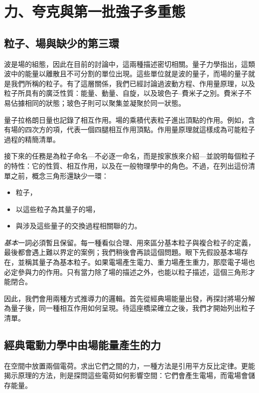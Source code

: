 \chapter{力、夸克與第一批強子多重態}

\section{粒子、場與缺少的第三環}

波是場的組態，因此在目前的討論中，這兩種描述密切相關。量子力學指出，這類波中的能量以離散且不可分割的單位出現。這些單位就是波的量子，而場的量子就是我們所稱的粒子。有了這層關係，我們已經討論過波動方程、作用量原理，以及粒子所具有的廣泛性質：能量、動量、自旋，以及玻色子--費米子之別。費米子不易佔據相同的狀態；玻色子則可以聚集並凝聚於同一狀態。

量子拉格朗日量也記錄了相互作用。場的乘積代表粒子進出頂點的作用。例如，含有場的四次方的項，代表一個四腿相互作用頂點。作用量原理就這樣成為可能粒子過程的精簡清單。

接下來的任務是為粒子命名---不必逐一命名，而是按家族來介紹---並說明每個粒子的特性：它的性質、相互作用，以及在一般物理學中的角色。不過，在列出這份清單之前，概念三角形還缺少一環：
\begin{itemize}
\item 粒子，
\item 以這些粒子為其量子的場，
\item 與涉及這些量子的交換過程相關聯的力。
\end{itemize}

\emph{基本}一詞必須暫且保留。每一種看似合理、用來區分基本粒子與複合粒子的定義，最後都會遇上難以界定的案例；我們稍後會再談這個問題。眼下先假設基本場存在，並稱其量子為基本粒子。如果電場產生電力、重力場產生重力，那麼電子場也必定參與力的作用。只有當力除了場的描述之外，也能以粒子描述，這個三角形才能閉合。

因此，我們會用兩種方式推導力的邏輯。首先從經典場能量出發，再探討將場分解為量子後，同一種相互作用如何呈現。待這座橋梁確立之後，我們才開始列出粒子清單。

\section{經典電動力學中由場能量產生的力}

在空間中放置兩個電荷。求出它們之間的力，一種方法是引用平方反比定律。更能揭示原理的方法，則是探問這些電荷如何影響空間：它們會產生電場，而電場會儲存能量。

